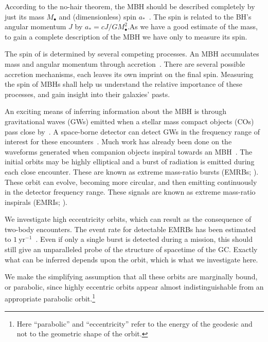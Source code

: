 \documentclass[11pt,twoside]{article}
\begin{document}
According to the no-hair theorem, the MBH should be described completely by just its mass $M_\bullet$ and (dimensionless) spin $a_\ast$~\citep{Israel1967, Israel1968, Carter1971, Hawking1972, Robinson1975, Chandrasekhar1998}. The spin is related to the BH's angular momentum $J$ by $a_\ast = cJ/GM_\bullet^2$.As we have a good estimate of the mass, to gain a complete description of the MBH we have only to measure its spin.

The spin of is determined by several competing processes. An MBH accumulates mass and angular momentum through accretion~\citep{Volonteri2010}. There are several possible accretion mechanisms, each leaves its own imprint on the final spin. Measuring the spin of MBHs shall help us understand the relative importance of these processes, and gain insight into their galaxies' pasts.

An exciting means of inferring information about the MBH is through gravitational waves (GWs) emitted when a stellar mass compact objects (COs) pass close by~\citep{Sathyaprakash2009}. A space-borne detector can detect GWs in the frequency range of interest for these encounters~\citep{Bender1998, Danzmann2003, Jennrich2011, Amaro-Seoane2012a}. Much work has already been done on the waveforms generated when companion objects inspiral towards an MBH~\citep{Glampedakis2005, Barack2009}. The initial orbits may be highly elliptical and a burst of radiation is emitted during each close encounter. These are known as extreme mass-ratio bursts (EMRBs; \citealt{Rubbo2006}). These orbit can evolve, becoming more circular, and then emitting continuously in the detector frequency range. These signals are known as extreme mass-ratio inspirals (EMRIs; \citealt{Amaro-Seoane2007}).

We investigate high eccentricity orbits, which can result as the consequence of two-body encounters. The event rate for detectable EMRBs has been estimated to $1~\mathrm{yr^{-1}}$~\citep*{Hopman2007}. Even if only a single burst is detected during a mission, this should still give an unparalleled probe of the structure of spacetime of the GC. Exactly what can be inferred depends upon the orbit, which is what we investigate here. 

We make the simplifying assumption that all these orbits are marginally bound, or parabolic, since highly eccentric orbits appear almost indistinguishable from an appropriate parabolic orbit.\footnote{Here ``parabolic'' and ``eccentricity'' refer to the energy of the geodesic and not to the geometric shape of the orbit.}
\end{document}
